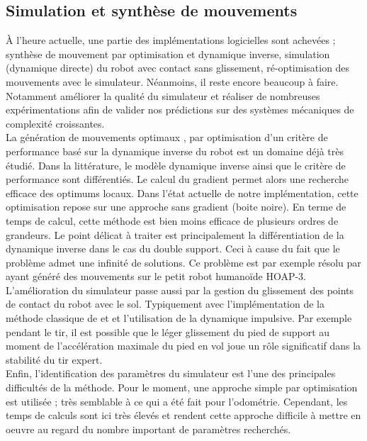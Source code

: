 \subsection{Simulation et synthèse de mouvements}

À l'heure actuelle, une partie des implémentations logicielles sont achevées ;
synthèse de mouvement par optimisation et dynamique inverse, 
simulation (dynamique directe) du robot avec contact sans glissement,
ré-optimisation des mouvements avec le simulateur.
Néanmoins, il reste encore beaucoup à faire.
Notamment améliorer la qualité du simulateur et réaliser 
de nombreuses expérimentations afin de valider nos prédictions
sur des systèmes mécaniques de complexité croissantes.\\

La génération de mouvements \og optimaux \fg, par optimisation
d'un critère de performance basé sur la dynamique inverse 
du robot est un domaine déjà très étudié.
Dans la littérature, le modèle dynamique inverse ainsi que
le critère de performance sont différentiés.
Le calcul du gradient permet alors une recherche efficace 
des optimums locaux.
Dans l'état actuelle de notre implémentation, cette optimisation
repose sur une approche sans gradient (boite noire).
En terme de temps de calcul, cette méthode est bien moins 
efficace de plusieurs ordres de grandeurs.
Le point délicat à traiter est principalement la différentiation 
de la dynamique inverse dans le cas du double support.
Ceci à cause du fait que le problème admet une infinité de solutions.
Ce problème est par exemple résolu par \cite{lengagne_planification_2009}
ayant généré des mouvements sur le petit robot humanoïde HOAP-3.\\

L'amélioration du simulateur passe aussi par la gestion du glissement
des points de contact du robot avec le sol.
Typiquement avec l'implémentation de la méthode classique de 
\cite{anitescu_formulating_1997} et \cite{stewart_implicit_1996}
et l'utilisation de la dynamique impulsive.
Par exemple pendant le tir, il est possible que le léger glissement 
du pied de support au moment de l'accélération maximale 
du pied en vol joue un rôle significatif dans la stabilité du tir expert.\\

Enfin, l'identification des paramètres du simulateur 
est l'une des principales difficultés de la méthode.
Pour le moment, une approche simple par optimisation est utilisée ;
très semblable à ce qui a été fait pour l'odométrie.
Cependant, les temps de calculs sont ici très élevés et rendent 
cette approche difficile à mettre en oeuvre au regard 
du nombre important de paramètres recherchés.


